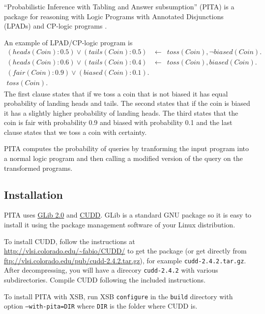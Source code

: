 

``Probabilistic  Inference with Tabling and Answer subsumption'' (PITA) \cite{RigSwi10-ICLP10-IC} is a package  for reasoning with Logic Programs with Annotated Disjunctions (LPADs)\cite{VenVer03-TR,VenVer04-ICLP04-IC} and CP-logic programs \cite{VenDenBru-JELIA06,DBLP:journals/tplp/VennekensDB09}.

An example of LPAD/CP-logic program is 
\begin{eqnarray*}
(heads(Coin):0.5)\vee (tails(Coin):0.5)&\leftarrow&
toss(Coin),\neg biased(Coin).\\
(heads(Coin):0.6)\vee (tails(Coin):0.4)&\leftarrow&
toss(Coin), biased(Coin).\\
(fair(Coin):0.9) \vee (biased(Coin):0.1).&&\\
toss(Coin).&&
\end{eqnarray*}
The first clause states that if we toss a coin that is not biased it has equal probability of landing heads and tails. The second states that if the coin is biased it has a slightly higher probability of landing heads. The third states that the coin is fair with probability 0.9 and biased with probability 0.1 and the last clause states that we toss a coin with certainty.

PITA computes the probability of queries by tranforming the input program into a normal logic program and then calling a modified version of the query on the transformed programs.

\subsection{Installation}
PITA uses \href{http://www.gtk.org/}{GLib 2.0} and  \href{http://vlsi.colorado.edu/~fabio/CUDD/}{CUDD}.
GLib is a standard GNU package 
so it is easy to install it using the package management software of your Linux 
distribution.

To install CUDD, follow the instructions at  \url{http://vlsi.colorado.edu/~fabio/CUDD/} to get the package (or get directly from \url{ftp://vlsi.colorado.edu/pub/cudd-2.4.2.tar.gz}), for example \texttt{cudd-2.4.2.tar.gz}.
After decompressing, you will have a direcory \texttt{cudd-2.4.2} with various subdirectories.
Compile CUDD following the included instructions.

To install PITA with XSB, run XSB \texttt{configure} in the \texttt{build} directory with option \texttt{--with-pita=DIR} where \texttt{DIR} is the folder where CUDD is.


